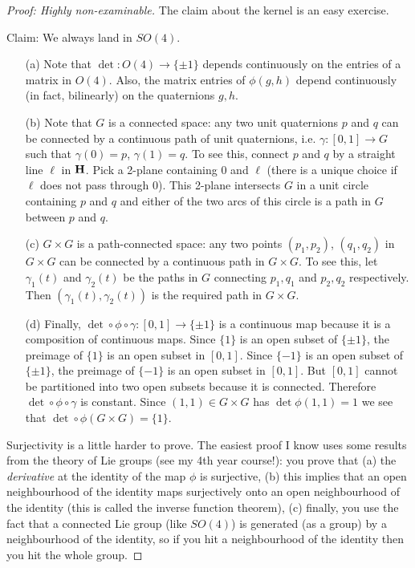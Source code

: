 \documentclass[12pt]{article}
\begin{document}
\begin{proof}[Proof: Highly non-examinable]
  The claim about the kernel is an easy exercise.

  Claim: We always land in $SO(4)$.

  \begin{enumerate}
  \item[(a)] Note that $\det\colon O(4)\to\{\pm 1\}$ depends continuously on the entries of a matrix in $O(4)$. Also, the matrix entries of $\phi(g,h)$ depend continuously (in fact, bilinearly) on the quaternions $g,h$.
  \item[(b)] Note that $G$ is a connected space: any two unit quaternions $p$ and $q$ can be connected by a continuous path of unit quaternions, i.e. $\gamma\colon[0,1]\to G$ such that $\gamma(0)=p$, $\gamma(1)=q$. To see this, connect $p$ and $q$ by a straight line $\ell$ in $\mathbf{H}$. Pick a 2-plane containing 0 and $\ell$ (there is a unique choice if $\ell$ does not pass through 0). This 2-plane intersects $G$ in a unit circle containing $p$ and $q$ and either of the two arcs of this circle is a path in $G$ between $p$ and $q$.
  \item[(c)] $G\times G$ is a path-connected space: any two points $(p_1,p_2)$, $(q_1,q_2)$ in $G\times G$ can be connected by a continuous path in $G\times G$. To see this, let $\gamma_1(t)$ and $\gamma_2(t)$ be the paths in $G$ connecting $p_1,q_1$ and $p_2,q_2$ respectively. Then $(\gamma_1(t),\gamma_2(t))$ is the required path in $G\times G$.
  \item[(d)] Finally, $\det\circ\phi\circ\gamma\colon [0,1]\to\{\pm 1\}$ is a continuous map because it is a composition of continuous maps. Since $\{1\}$ is an open subset of $\{\pm 1\}$, the preimage of $\{1\}$ is an open subset in $[0,1]$. Since $\{-1\}$ is an open subset of $\{\pm 1\}$, the preimage of $\{-1\}$ is an open subset in $[0,1]$. But $[0,1]$ cannot be partitioned into two open subsets because it is connected. Therefore $\det\circ\phi\circ\gamma$ is constant. Since $(1,1)\in G\times G$ has $\det\phi(1,1)=1$ we see that $\det\circ\phi(G\times G)=\{1\}$.
  \end{enumerate}
  Surjectivity is a little harder to prove. The easiest proof I know uses some results from the theory of Lie groups (see my 4th year course!): you prove that (a) the {\em derivative} at the identity of the map $\phi$ is surjective, (b) this implies that an open neighbourhood of the identity maps surjectively onto an open neighbourhood of the identity (this is called the inverse function theorem), (c) finally, you use the fact that a connected Lie group (like $SO(4)$) is generated (as a group) by a neighbourhood of the identity, so if you hit a neighbourhood of the identity then you hit the whole group.
\end{proof}
\end{document}
